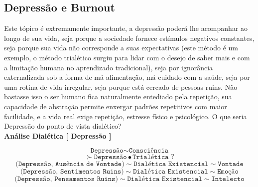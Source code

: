 \documentclass[10pt,a4paper]{report}
\begin{document}
% 


\subsection{Depressão e Burnout}

\hspace{\baselineskip}

Este tópico é extremamente importante, a depressão poderá lhe acompanhar ao longo de sua vida, seja porque a sociedade fornece estímulos negativos constantes, seja porque sua vida não corresponde a suas expectativas (este método é um exemplo, o método trialético surgiu para lidar com o desejo de saber mais e com a limitação humana no aprendizado tradicional), seja por ignorância externalizada sob a forma de má alimentação, má cuidado com a saúde, seja por uma rotina de vida irregular, seja porque está cercado de pessoas ruins. Não bastasse isso o ser humano fica naturalmente entediado pela repetição, sua capacidade de abstração permite enxergar padrões repetitivos com maior facilidade, e a vida real exige repetição, estresse físico e psicológico. O que seria Depressão do ponto de vista dialético? \\




\textbf{Análise Dialética [ Depressão ]}

$$ \texttt{Depressão} \sim \texttt{Consciência} $$
$$ \succ \texttt{Depressão} \bullet \texttt{Trialética ?} $$
$$ \texttt{(Depressão, Ausência de Vontade)} \sim \texttt{Dialética Existencial} \sim \texttt{Vontade} $$
$$ \texttt{(Depressão, Sentimentos Ruins)} \sim \texttt{Dialética Existencial} \sim \texttt{Emoção} $$
$$ \texttt{(Depressão, Pensamentos Ruins)} \sim \texttt{Dialética Existencial} \sim \texttt{Intelecto} $$
\end{document}
